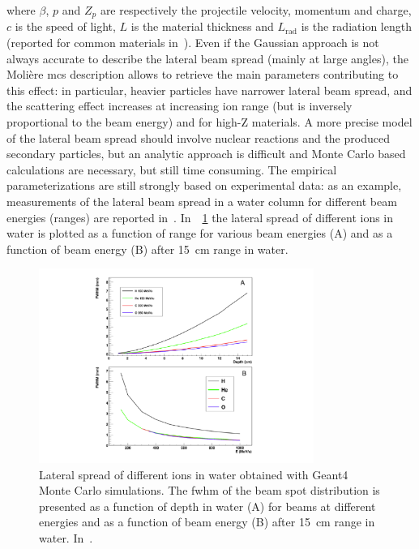 where $\beta$, $p$ and $Z_{p}$ are respectively the projectile velocity, momentum and charge, $c$ is the speed of light,  $L$ is the material thickness and $L_{\mathrm{rad}}$ is the radiation length (reported for common materials in~\cite{Tsai1974}). 
Even if the Gaussian approach is not always accurate to describe the lateral beam spread (mainly at large angles), the Moli\`{e}re \gls{mcs} description allows to retrieve the main parameters contributing to this effect: in particular, heavier particles have narrower lateral beam spread, and the scattering effect increases at increasing ion range (but is inversely proportional to the beam energy) and for high-Z materials. A more precise model of the lateral beam spread should involve nuclear reactions and the produced secondary particles, but an analytic approach is difficult and Monte Carlo based calculations are necessary, but still time consuming. The empirical parameterizations are still strongly based on experimental data: as an example, measurements of the lateral beam spread in a water column for different beam energies (ranges) are reported in~\cite{Pedroni2005}. In~\figurename~\ref{chap1::fig::latSpread} the lateral spread of different ions in water is plotted as a function of range for various beam energies (A) and as a function of beam energy (B) after 15~cm range in water.

\begin{figure}[!htbp]
\centering
\includegraphics[width=0.8\textwidth]{03_GraphicFiles/chapter1_Introduction/lateralSpread.pdf}
\caption{Lateral spread of different ions in water obtained with Geant4 Monte Carlo simulations. The \gls{fwhm} of the beam spot distribution is presented as a function of depth in water (A) for beams at different energies and as a function of beam energy (B) after 15~cm range in water. In~\cite{Durante2016}.}
\label{chap1::fig::latSpread}
\end{figure}   

